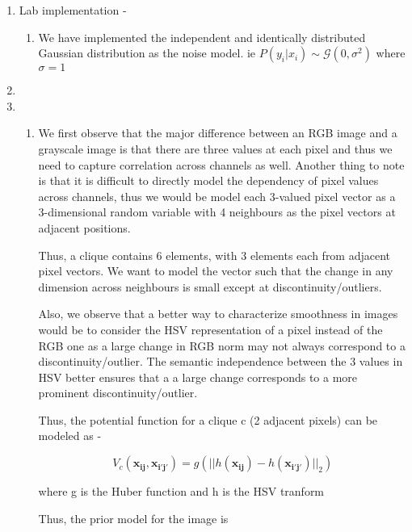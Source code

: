 \documentclass[11pt]{article}
\begin{document}
\maketitle

\begin{enumerate}
    \item 
    Lab implementation - 
    \begin{enumerate}
        \item We have implemented the independent and identically distributed Gaussian distribution as the noise model. ie $P(y_i | x_i) \sim \mathcal{G}(0, \sigma^2)$ where $\sigma=1$
    \end{enumerate}
    \item 
    \item \begin{enumerate}
        \item We first observe that the major difference between an RGB image and a grayscale image is that there are three values at each pixel and thus we need to capture correlation across channels as well. Another thing to note is that it is difficult to directly model the dependency of pixel values across channels, thus we would be model each 3-valued pixel vector as a 3-dimensional random variable with 4 neighbours as the pixel vectors at adjacent positions. 
        
        Thus, a clique contains 6 elements, with 3 elements each from adjacent pixel vectors. We want to model the vector such that the change in any dimension across neighbours is small except at discontinuity/outliers.
        
        Also, we observe that a better way to characterize smoothness in images would be to consider the HSV representation of a pixel instead of the RGB one as a large change in RGB norm may not always correspond to a discontinuity/outlier. The semantic independence between the 3 values in HSV better ensures that a a large change corresponds to a more prominent discontinuity/outlier.
        
        Thus, the potential function for a clique c (2 adjacent pixels) can be modeled as - 
        
        $$
        V_c(\boldsymbol{x_{ij}},\boldsymbol{x_{i'j'}}) = g(||h(\boldsymbol{x_{ij}}) - h(\boldsymbol{x_{i'j'}})||_2)
        $$
        
        where g is the Huber function and h is the HSV tranform
        
        Thus, the prior model for the image is 
        

\end{enumerate}
\end{enumerate}
\end{document}
